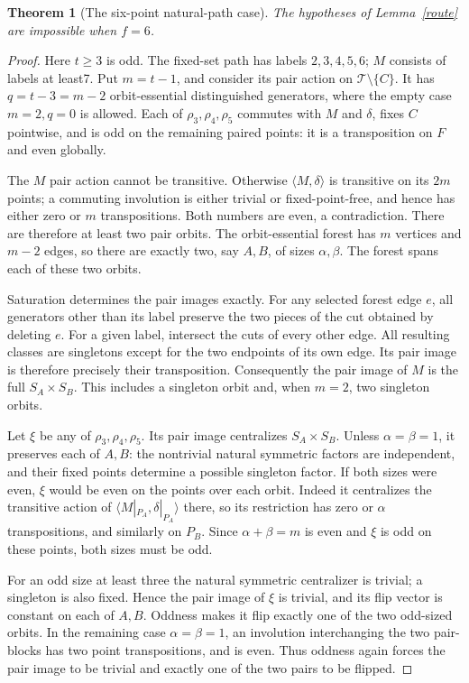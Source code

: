 \documentclass[10pt,a4paper]{article}
\newtheorem{theorem}[lemma]{Theorem}
\newcommand{\gen}[1]{\langle#1\rangle}
\begin{document}
\begin{theorem}[The six-point natural-path case]\label{six}
The hypotheses of Lemma~\ref{route} are impossible when $f=6$.
\end{theorem}
\begin{proof}
Here $t\geq3$ is odd. The fixed-set path has labels $2,3,4,5,6$;
$M$ consists of labels at least7. Put $m=t-1$, and consider its
pair action on $\mathcal T\setminus\{C\}$. It has $q=t-3=m-2$
orbit-essential distinguished generators, where the empty case
$m=2,q=0$ is allowed. Each of $\rho_3,\rho_4,\rho_5$ commutes with
$M$ and $\delta$, fixes $C$ pointwise, and is odd on the remaining
paired points: it is a transposition on $F$ and even globally.

The $M$ pair action cannot be transitive. Otherwise
$\gen{M,\delta}$ is transitive on its $2m$ points; a commuting
involution is either trivial or fixed-point-free, and hence has
either zero or $m$ transpositions. Both numbers are even, a
contradiction. There are therefore at least two pair orbits.
The orbit-essential forest has $m$ vertices and $m-2$ edges,
so there are exactly two, say $A,B$, of sizes $\alpha,\beta$.
The forest spans each of these two orbits.

Saturation determines the pair images exactly. For any selected
forest edge $e$, all generators other than its label preserve the
two pieces of the cut obtained by deleting $e$. For a given label,
intersect the cuts of every other edge. All resulting classes are
singletons except for the two endpoints of its own edge. Its pair
image is therefore precisely their transposition. Consequently
the pair image of $M$ is the full $S_A\times S_B$.
This includes a singleton orbit and, when $m=2$, two singleton orbits.

Let $\xi$ be any of $\rho_3,\rho_4,\rho_5$. Its pair image centralizes
$S_A\times S_B$. Unless $\alpha=\beta=1$, it preserves each of $A,B$:
the nontrivial natural symmetric factors are independent, and their
fixed points determine a possible singleton factor. If both sizes
were even, $\xi$ would be even on the points over each orbit.
Indeed it centralizes the transitive action of
$\gen{M|_{P_A},\delta|_{P_A}}$ there, so its restriction has zero
or $\alpha$ transpositions, and similarly on $P_B$.
Since $\alpha+\beta=m$ is even and $\xi$ is odd on these points,
both sizes must be odd.

For an odd size at least three the natural symmetric centralizer
is trivial; a singleton is also fixed. Hence the pair image of
$\xi$ is trivial, and its flip vector is constant on each of
$A,B$. Oddness makes it flip exactly one of the two odd-sized
orbits. In the remaining case $\alpha=\beta=1$, an involution
interchanging the two pair-blocks has two point transpositions,
and is even. Thus oddness again forces the pair image to be trivial
and exactly one of the two pairs to be flipped.


\end{proof}
\end{document}
